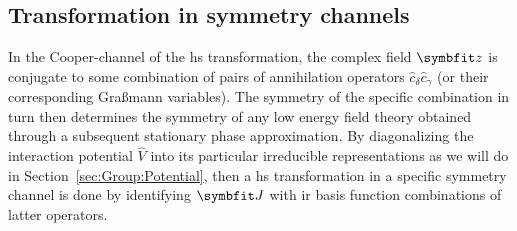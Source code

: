 \subsection{Transformation in symmetry channels}

In the Cooper-channel of the \ac{hs} transformation, the complex field $\v{z}$ is conjugate to some combination
of pairs of annihilation operators $\hat{c}_\delta \hat{c}_\gamma$ (or their corresponding Gra\ss mann variables).
The symmetry of the specific combination in turn then determines the symmetry of any low energy field theory obtained
through a subsequent stationary phase approximation. By diagonalizing the interaction potential $\hat{V}$ into its particular
irreducible representations as we will do in Section~\ref{sec:Group:Potential}, then a \ac{hs} transformation
in a specific symmetry channel is done by identifying $\v{J}$ with \ac{ir} basis function combinations of latter operators. 

